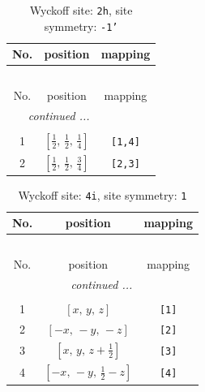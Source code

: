 \documentclass[fleqn,8pt]{jsarticle}
\begin{document}
\begin{longtable}{ccc}
\caption{Wyckoff site: {\tt 2h}, site symmetry: {\tt -1'}}
 \\
 \hline \hline
No. & position & mapping \\ \hline \endfirsthead

\multicolumn{2}{l}{\tablename\ \thetable{}} \\
 \hline \hline
No. & position & mapping \\ \hline \endhead

 \hline \hline
\multicolumn{2}{r}{\footnotesize\it continued ...} \\ \endfoot

 \hline \hline
\multicolumn{2}{r}{} \\ \endlastfoot

1 & $\left[ \frac{1}{2},\, \frac{1}{2},\, \frac{1}{4} \right]$ & {\tt [1,4]} \\ \hline
2 & $\left[ \frac{1}{2},\, \frac{1}{2},\, \frac{3}{4} \right]$ & {\tt [2,3]} \\
\end{longtable}
\renewcommand{\arraystretch}{1.2}
\begin{longtable}{ccc}
\caption{Wyckoff site: {\tt 4i}, site symmetry: {\tt 1}}
 \\
 \hline \hline
No. & position & mapping \\ \hline \endfirsthead

\multicolumn{2}{l}{\tablename\ \thetable{}} \\
 \hline \hline
No. & position & mapping \\ \hline \endhead

 \hline \hline
\multicolumn{2}{r}{\footnotesize\it continued ...} \\ \endfoot

 \hline \hline
\multicolumn{2}{r}{} \\ \endlastfoot

1 & $\left[ x,\, y,\, z \right]$ & {\tt [1]} \\ \hline
2 & $\left[ - x,\, - y,\, - z \right]$ & {\tt [2]} \\ \hline
3 & $\left[ x,\, y,\, z + \frac{1}{2} \right]$ & {\tt [3]} \\ \hline
4 & $\left[ - x,\, - y,\, \frac{1}{2} - z \right]$ & {\tt [4]} \\
\end{longtable}
\end{document}
